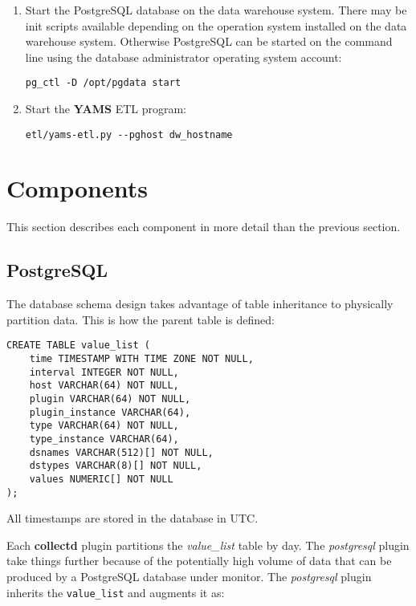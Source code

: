 \documentclass[a4paper,twoside,12pt]{article}
\begin{document}
\begin{enumerate}
  \item Start the PostgreSQL database on the data warehouse system.  There may
        be init scripts available depending on the operation system installed
        on the data warehouse system.  Otherwise PostgreSQL can be started on
        the command line using the database administrator operating system
        account:
        \lstset{language=sh}
        \begin{lstlisting}
pg_ctl -D /opt/pgdata start
        \end{lstlisting}
  \item Start the \textbf{YAMS} ETL program:
        \lstset{language=sh}
        \begin{lstlisting}
etl/yams-etl.py --pghost dw_hostname
        \end{lstlisting}
\end{enumerate}

\section{Components}

This section describes each component in more detail than the previous section.

\subsection{PostgreSQL}

The database schema design takes advantage of table inheritance to physically
partition data.  This is how the parent table is defined:
\lstset{language=sql}
\begin{lstlisting}
CREATE TABLE value_list (
    time TIMESTAMP WITH TIME ZONE NOT NULL,
    interval INTEGER NOT NULL,
    host VARCHAR(64) NOT NULL,
    plugin VARCHAR(64) NOT NULL,
    plugin_instance VARCHAR(64),
    type VARCHAR(64) NOT NULL,
    type_instance VARCHAR(64),
    dsnames VARCHAR(512)[] NOT NULL,
    dstypes VARCHAR(8)[] NOT NULL,
    values NUMERIC[] NOT NULL
);
\end{lstlisting}

All timestamps are stored in the database in UTC.

Each \textbf{collectd} plugin partitions the \textit{value\_list} table by day.
The \textit{postgresql} plugin take things further because of the potentially
high volume of data that can be produced by a PostgreSQL database under
monitor.  The \textit{postgresql} plugin inherits the \texttt{value\_list} and
augments it as:
\end{document}
